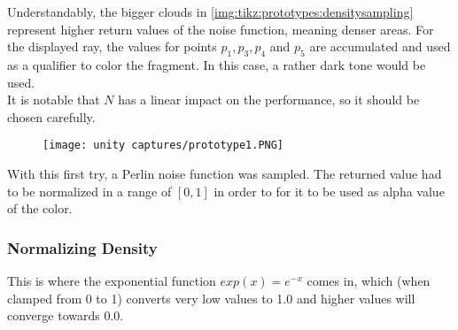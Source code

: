 \noindent
Understandably, the bigger clouds in \autoref{img:tikz:prototypes:densitysampling} represent higher return values of the noise function, meaning denser areas.
For the displayed ray, the values for points $p_1, p_3, p_4$ and $p_5$ are accumulated and used as a qualifier to color the fragment. In this case, a rather dark tone would be used.
\\
It is notable that $N$ has a linear impact on the performance, so it should be chosen carefully.

\begin{figure}[H]
    \centering
    \texttt{[image: unity captures/prototype1.PNG]}
    \label{img:captures:prototype1}
\end{figure}

\noindent
With this first try, a Perlin noise function was sampled. The returned value had to be normalized in a range of $[0, 1]$ in order to for it to be used as alpha value of the color.

\subsubsection{Normalizing Density}
This is where the exponential function $exp(x) = e^{-x}$ comes in, which (when clamped from 0 to 1) converts very low values to 1.0 and higher values will converge towards 0.0.

